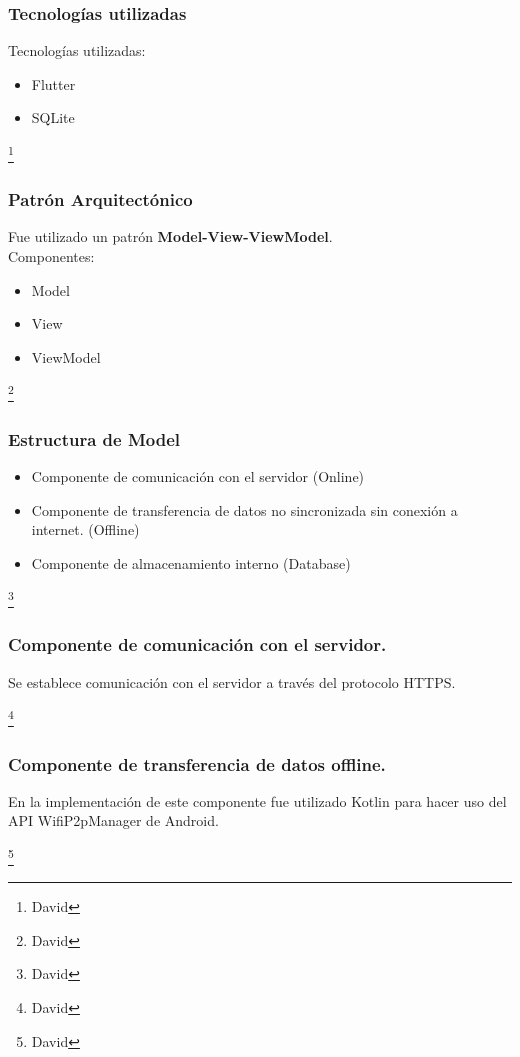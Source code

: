 \documentclass[14pt]{beamer}
\begin{document}
\begin{frame}
\frametitle{Tecnologías utilizadas}

Tecnologías utilizadas:
\begin{itemize}
\item Flutter
\item SQLite
\end{itemize}
\footnote{David}
\end{frame}


\begin{frame}
\frametitle{Patrón Arquitectónico}

Fue utilizado un patrón \textbf{Model-View-ViewModel}.
\\
Componentes:
\begin{itemize}
\item Model
\item View
\item ViewModel
\end{itemize}

\footnote{David}
\end{frame}





\begin{frame}
\frametitle{Estructura de Model}

\begin{itemize}
\item Componente de comunicación con el servidor (Online)

\item Componente de transferencia de datos no sincronizada sin conexión a internet. (Offline)

\item Componente de almacenamiento interno (Database)

\end{itemize}

\footnote{David}
\end{frame}

\begin{frame}
\frametitle{Componente de comunicación con el servidor.}

\begin{block}{}
Se establece comunicación con el servidor a través del protocolo HTTPS.
\end{block}
\footnote{David}
\end{frame}

\begin{frame}
\frametitle{Componente de transferencia de datos offline.}

\begin{block}{}
En la implementación de este componente fue utilizado Kotlin para hacer uso del API WifiP2pManager de Android.
\end{block}
\footnote{David}
\end{frame}
\end{document}
